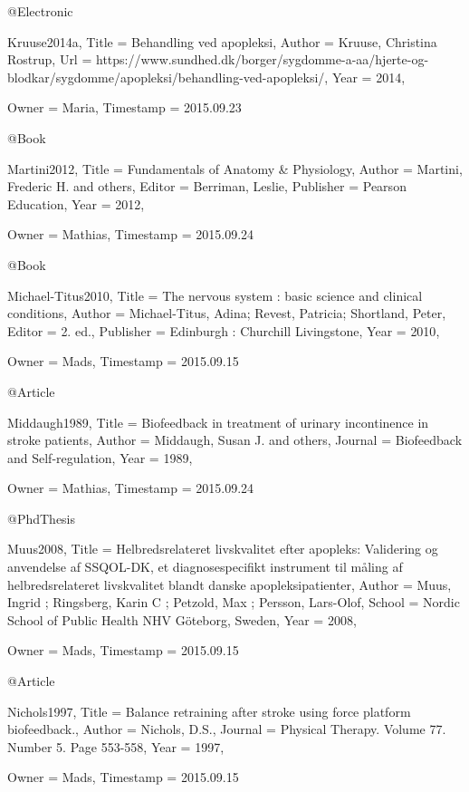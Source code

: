 @Electronic{Kruuse2014a,
  Title                    = {Behandling ved apopleksi},
  Author                   = {Kruuse, Christina Rostrup},
  Url                      = {https://www.sundhed.dk/borger/sygdomme-a-aa/hjerte-og-blodkar/sygdomme/apopleksi/behandling-ved-apopleksi/},
  Year                     = {2014},

  Owner                    = {Maria},
  Timestamp                = {2015.09.23}
}

@Book{Martini2012,
  Title                    = {Fundamentals of Anatomy \& Physiology},
  Author                   = {Martini, Frederic H. and others},
  Editor                   = {Berriman, Leslie},
  Publisher                = {Pearson Education},
  Year                     = {2012},

  Owner                    = {Mathias},
  Timestamp                = {2015.09.24}
}

@Book{Michael-Titus2010,
  Title                    = {The nervous system : basic science and clinical conditions},
  Author                   = {Michael-Titus, Adina; Revest, Patricia; Shortland, Peter},
  Editor                   = {2. ed.},
  Publisher                = {Edinburgh : Churchill Livingstone},
  Year                     = {2010},

  Owner                    = {Mads},
  Timestamp                = {2015.09.15}
}

@Article{Middaugh1989,
  Title                    = {Biofeedback in treatment of urinary incontinence in stroke patients},
  Author                   = {Middaugh, Susan J. and others},
  Journal                  = {Biofeedback and Self-regulation},
  Year                     = {1989},

  Owner                    = {Mathias},
  Timestamp                = {2015.09.24}
}

@PhdThesis{Muus2008,
  Title                    = {Helbredsrelateret livskvalitet efter apopleks: Validering og anvendelse af SSQOL-DK, et diagnosespecifikt instrument til måling af helbredsrelateret livskvalitet blandt danske apopleksipatienter},
  Author                   = {Muus, Ingrid ; Ringsberg, Karin C ; Petzold, Max ; Persson, Lars-Olof},
  School                   = {Nordic School of Public Health NHV Göteborg, Sweden},
  Year                     = {2008},

  Owner                    = {Mads},
  Timestamp                = {2015.09.15}
}

@Article{Nichols1997,
  Title                    = {Balance retraining after stroke using force platform biofeedback.},
  Author                   = {Nichols, D.S.},
  Journal                  = {Physical Therapy. Volume 77. Number 5. Page 553-558},
  Year                     = {1997},

  Owner                    = {Mads},
  Timestamp                = {2015.09.15}
}


